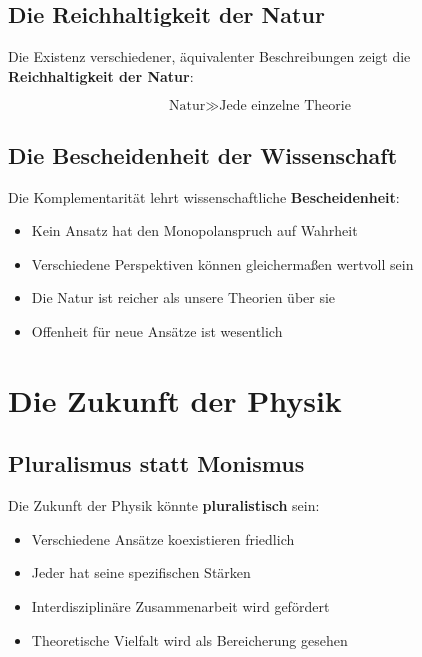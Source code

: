 \documentclass[12pt,a4paper]{report}
\begin{document}
	\subsection{Die Reichhaltigkeit der Natur}
	
	Die Existenz verschiedener, äquivalenter Beschreibungen zeigt die \textbf{Reichhaltigkeit der Natur}:
	
	\begin{equation}
		\text{Natur} \gg \text{Jede einzelne Theorie}
	\end{equation}
	
	\subsection{Die Bescheidenheit der Wissenschaft}
	
	Die Komplementarität lehrt wissenschaftliche \textbf{Bescheidenheit}:
	
	\begin{itemize}
		\item Kein Ansatz hat den Monopolanspruch auf Wahrheit
		\item Verschiedene Perspektiven können gleichermaßen wertvoll sein
		\item Die Natur ist reicher als unsere Theorien über sie
		\item Offenheit für neue Ansätze ist wesentlich
	\end{itemize}
	
	\section{Die Zukunft der Physik}
	
	\subsection{Pluralismus statt Monismus}
	
	Die Zukunft der Physik könnte \textbf{pluralistisch} sein:
	
	\begin{itemize}
		\item Verschiedene Ansätze koexistieren friedlich
		\item Jeder hat seine spezifischen Stärken
		\item Interdisziplinäre Zusammenarbeit wird gefördert
		\item Theoretische Vielfalt wird als Bereicherung gesehen
	\end{itemize}
	
\end{document}
